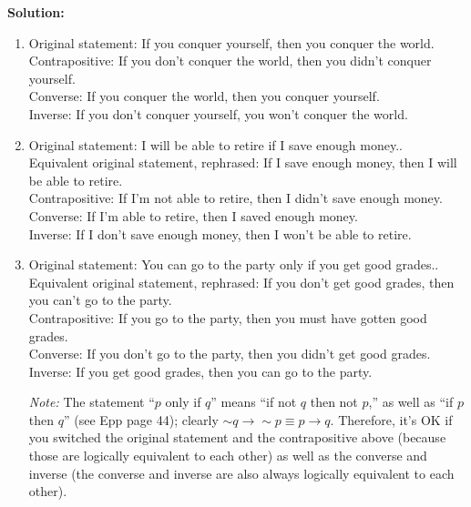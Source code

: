 \documentclass[12pt, letterpaper]{report}
\newcommand{\nott}{{\sim}}
\begin{document}
\begin{enumerate}
\begin{enumerate}
		
	\end{enumerate}
	
	\textbf{Solution:} 
        \begin{enumerate}
                \item Original statement: If you conquer yourself, then you conquer the world. \\
                Contrapositive: If you don't conquer the world, then you didn't conquer yourself. \\
                Converse: If you conquer the world, then you conquer yourself.\\
                Inverse: If you don't conquer yourself, you won't conquer the world. 

                
                \item Original statement: I will be able to retire if I save enough money.. \\
                Equivalent original statement, rephrased: If I save enough money, then I will be able to retire. \\
                Contrapositive: If I'm not able to retire, then I didn't save enough money. \\
                Converse: If I'm able to retire, then I saved enough money. \\
                Inverse: If I don't save enough money, then I won't be able to retire.
                
                \item Original statement: You can go to the party only if you get good grades..  \\
                Equivalent original statement, rephrased: If you don't get good grades, then you can't go to the party. \\
                Contrapositive: If you go to the party, then you must have gotten good grades.\\
                Converse: If you don't go to the party, then you didn't get good grades.\\
                Inverse: If you get good grades, then you can go to the party.
                
                \emph{Note:} The statement ``$p$ only if $q$'' means ``if not $q$ then not $p$,'' as well as ``if $p$ then $q$'' (see Epp page 44);
                clearly $\nott q \to \nott p \equiv p \to q$.  Therefore, it's OK if you switched the original statement and the contrapositive above (because
                those are logically equivalent to each other) as well as the converse and inverse (the converse and inverse are also always logically equivalent
                to each other).


\end{enumerate}
\end{enumerate}
\end{document}
